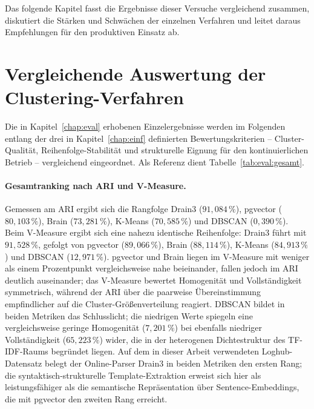 Das folgende Kapitel fasst die Ergebnisse dieser Versuche vergleichend zusammen, diskutiert die Stärken und Schwächen der einzelnen Verfahren und leitet daraus Empfehlungen für den produktiven Einsatz ab.

\section{Vergleichende Auswertung der Clustering-Verfahren}
\label{sec:abschluss:auswertung}

Die in Kapitel~\ref{chap:eval} erhobenen Einzelergebnisse werden im Folgenden entlang der drei in Kapitel~\ref{chap:einf} definierten Bewertungskriterien -- Cluster-Qualität, Reihenfolge-Stabilität und strukturelle Eignung für den kontinuierlichen Betrieb -- vergleichend eingeordnet. Als Referenz dient Tabelle~\ref{tab:eval:gesamt}.

\paragraph{Gesamtranking nach ARI und V-Measure.}
Gemessen am ARI ergibt sich die Rangfolge Drain3 ($91{,}084\,\%$), pgvector ($80{,}103\,\%$), Brain ($73{,}281\,\%$), K-Means ($70{,}585\,\%$) und DBSCAN ($0{,}390\,\%$). Beim V-Measure ergibt sich eine nahezu identische Reihenfolge: Drain3 führt mit $91{,}528\,\%$, gefolgt von pgvector ($89{,}066\,\%$), Brain ($88{,}114\,\%$), K-Means ($84{,}913\,\%$) und DBSCAN ($12{,}971\,\%$). pgvector und Brain liegen im V-Measure mit weniger als einem Prozentpunkt vergleichsweise nahe beieinander, fallen jedoch im ARI deutlich auseinander; das V-Measure bewertet Homogenität und Vollständigkeit symmetrisch, während der ARI über die paarweise Übereinstimmung empfindlicher auf die Cluster-Größenverteilung reagiert. DBSCAN bildet in beiden Metriken das Schlusslicht; die niedrigen Werte spiegeln eine vergleichsweise geringe Homogenität ($7{,}201\,\%$) bei ebenfalls niedriger Vollständigkeit ($65{,}223\,\%$) wider, die in der heterogenen Dichtestruktur des TF-IDF-Raums begründet liegen. Auf dem in dieser Arbeit verwendeten Loghub-Datensatz belegt der Online-Parser Drain3 in beiden Metriken den ersten Rang; die syntaktisch-strukturelle Template-Extraktion erweist sich hier als leistungsfähiger als die semantische Repräsentation über Sentence-Embeddings, die mit pgvector den zweiten Rang erreicht. 

